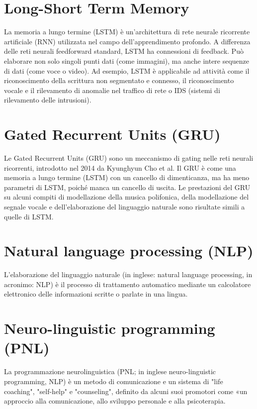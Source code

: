 \documentclass[12pt,a4paper]{report}
\begin{document}
\begin{appendices}
\section{Long-Short Term Memory}
\label{appendix:LSTM}
La memoria a lungo termine (LSTM) è un'architettura di rete neurale ricorrente artificiale (RNN) utilizzata nel campo dell'apprendimento profondo. A differenza delle reti neurali feedforward standard, LSTM ha connessioni di feedback. Può elaborare non solo singoli punti dati (come immagini), ma anche intere sequenze di dati (come voce o video). Ad esempio, LSTM è applicabile ad attività come il riconoscimento della scrittura non segmentato e connesso, il riconoscimento vocale e il rilevamento di anomalie nel traffico di rete o IDS (sistemi di rilevamento delle intrusioni). \cite{enwiki:1046770680}

\section{Gated Recurrent Units (GRU)}
\label{appendix:GRU}
Le Gated Recurrent Units (GRU) sono un meccanismo di gating nelle reti neurali ricorrenti, introdotto nel 2014 da Kyunghyun Cho et al. Il GRU è come una memoria a lungo termine (LSTM) con un cancello di dimenticanza, ma ha meno parametri di LSTM, poiché manca un cancello di uscita. Le prestazioni del GRU su alcuni compiti di modellazione della musica polifonica, della modellazione del segnale vocale e dell'elaborazione del linguaggio naturale sono risultate simili a quelle di LSTM.

\section{Natural language processing (NLP)}
\label{appendix:NLP}
L'elaborazione del linguaggio naturale (in inglese: natural language processing, in acronimo: NLP) è il processo di trattamento automatico mediante un calcolatore elettronico delle informazioni scritte o parlate in una lingua.

\section{Neuro-linguistic programming (PNL)}
\label{appendix:PNL}
La programmazione neurolinguistica (PNL; in inglese neuro-linguistic programming, NLP) è un metodo di comunicazione e un sistema di "life coaching", "self-help" e "counseling", definito da alcuni suoi promotori come «un approccio alla comunicazione, allo sviluppo personale e alla psicoterapia.


\end{appendices}
\end{document}

